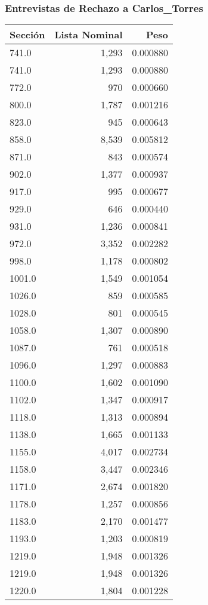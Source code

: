 \documentclass[a4paper,12pt]{article}
\begin{document}
\subsubsection*{Entrevistas de Rechazo a Carlos_Torres}
\begin{table}[h]
\centering
\begin{tabular}{lrr}
\toprule
Sección & Lista Nominal & Peso \\ \midrule
741.0 & 1,293 & 0.000880 \\ 
741.0 & 1,293 & 0.000880 \\ 
772.0 & 970 & 0.000660 \\ 
800.0 & 1,787 & 0.001216 \\ 
823.0 & 945 & 0.000643 \\ 
858.0 & 8,539 & 0.005812 \\ 
871.0 & 843 & 0.000574 \\ 
902.0 & 1,377 & 0.000937 \\ 
917.0 & 995 & 0.000677 \\ 
929.0 & 646 & 0.000440 \\ 
931.0 & 1,236 & 0.000841 \\ 
972.0 & 3,352 & 0.002282 \\ 
998.0 & 1,178 & 0.000802 \\ 
1001.0 & 1,549 & 0.001054 \\ 
1026.0 & 859 & 0.000585 \\ 
1028.0 & 801 & 0.000545 \\ 
1058.0 & 1,307 & 0.000890 \\ 
1087.0 & 761 & 0.000518 \\ 
1096.0 & 1,297 & 0.000883 \\ 
1100.0 & 1,602 & 0.001090 \\ 
1102.0 & 1,347 & 0.000917 \\ 
1118.0 & 1,313 & 0.000894 \\ 
1138.0 & 1,665 & 0.001133 \\ 
1155.0 & 4,017 & 0.002734 \\ 
1158.0 & 3,447 & 0.002346 \\ 
1171.0 & 2,674 & 0.001820 \\ 
1178.0 & 1,257 & 0.000856 \\ 
1183.0 & 2,170 & 0.001477 \\ 
1193.0 & 1,203 & 0.000819 \\ 
1219.0 & 1,948 & 0.001326 \\ 
1219.0 & 1,948 & 0.001326 \\ 
1220.0 & 1,804 & 0.001228 \\ 

\end{tabular}
\end{table}
\end{document}
